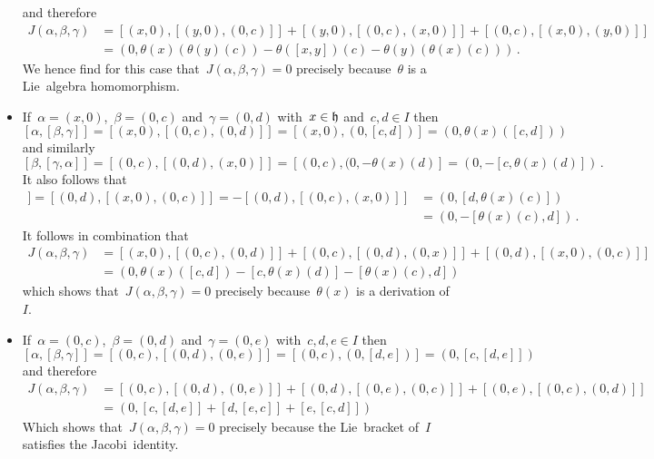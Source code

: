 \begin{example}
\begin{itemize}
\[      \]
      and therefore
      \begin{align*}
        J(\alpha, \beta, \gamma)
        &=
          [(x,0), [(y,0), (0,c)]]
        + [(y,0), [(0,c), (x,0)]]
        + [(0,c), [(x,0), (y,0)]]
        \\
        &=
        ( 0, \theta(x)(\theta(y)(c)) - \theta([x,y])(c) - \theta(y)(\theta(x)(c)) ) \,.
      \end{align*}
      We hence find for this case that~$J(\alpha, \beta, \gamma) = 0$ precisely because~$\theta$ is a Lie~algebra homomorphism.
    \item
      If~$\alpha = (x,0)$,~$\beta = (0,c)$ and~$\gamma = (0,d)$ with~$x \in \mathfrak{h}$ and~$c, d \in I$ then
      \[
        [\alpha, [\beta, \gamma]]
        =
        [(x,0), [(0,c), (0,d)]]
        =
        [(x,0), (0,[c,d])]
        =
        ( 0, \theta(x)([c,d]) )
      \]
      and similarly
      \[
        [\beta, [\gamma, \alpha]]
        =
        [(0,c), [(0,d), (x,0)]]
        =
        [(0,c), (0, -\theta(x)(d)]
        =
        ( 0, -[c,\theta(x)(d)] ) \,.
      \]
      It also follows that
      \begin{align*}
        [\gamma, [\alpha, \beta]]
        =
        [(0,d), [(x,0), (0,c)]]
        =
        - [(0,d), [(0,c), (x,0)]]
        &=
        ( 0, [d,\theta(x)(c)] )
        \\
        &=
        ( 0, -[\theta(x)(c), d] ) \,.
      \end{align*}
      It follows in combination that
      \begin{align*}
        J(\alpha, \beta, \gamma)
        &=
          [(x,0), [(0,c), (0,d)]]
        + [(0,c), [(0,d), (0,x)]]
        + [(0,d), [(x,0), (0,c)]]
        \\
        &=
        ( 0, \theta(x)([c,d]) - [c, \theta(x)(d)] - [\theta(x)(c), d] )
      \end{align*}
      which shows that~$J(\alpha, \beta, \gamma) = 0$ precisely because~$\theta(x)$ is a derivation of~$I$.
    \item
      If~$\alpha = (0,c)$,~$\beta = (0,d)$ and~$\gamma = (0,e)$ with~$c, d, e \in I$ then
      \[
        [\alpha, [\beta, \gamma]]
        =
        [(0,c), [(0,d), (0,e)]]
        =
        [(0,c), (0, [d,e])]
        =
        ( 0, [c,[d,e]] )
      \]
      and therefore
      \begin{align*}
        J(\alpha, \beta, \gamma)
        &=
          [(0,c), [(0,d), (0,e)]]
        + [(0,d), [(0,e), (0,c)]]
        + [(0,e), [(0,c), (0,d)]]
        \\
        &=
        ( 0, [c,[d,e]] + [d,[e,c]] + [e,[c,d]] )
      \end{align*}
      Which shows that~$J(\alpha, \beta, \gamma) = 0$ precisely because the Lie~bracket of~$I$ satisfies the Jacobi~identity.
  \end{itemize}
  

\end{example}

